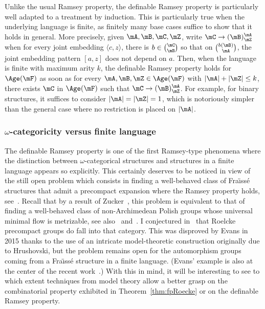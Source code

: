 Unlike the usual Ramsey property, the definable Ramsey property is particularly well adapted to a treatment by induction. This is particularly true when the underlying language is finite, as finitely many base cases suffice to show that it holds in general. More precisely, given $\mA, \mB, \mC, \mZ$, write $\mC \rightarrow (\mB)^{\mA}_{\mZ}$ when for every joint embedding $\langle c,z\rangle$, there is $b\in \binom{\mC}{\mB}$ so that on $\binom{b(\mB)}{\mA}$, the joint embedding pattern $[a,z]$ does not depend on $a$. Then, when the language is finite with maximum arity $k$, the definable Ramsey property holds for $\Age(\mF)$ as soon as for every $\mA, \mB, \mZ \in \Age(\mF)$ with $|\mA|+|\mZ|\leq k$, there exists $\mC$ in $\Age(\mF)$ such that $\mC \rightarrow (\mB)^{\mA}_{\mZ}$. For example, for binary structures, it suffices to consider $|\mA|=|\mZ|=1$, which is notoriously simpler than the general case where no restriction is placed on $|\mA|$.

\subsubsection{\texorpdfstring{$\omega$}{omega}-categoricity versus finite language}

The definable Ramsey property is one of the first Ramsey-type phenomena where the distinction between $\omega$-categorical structures and structures in a finite language appears so explicitly. This certainly deserves to be noticed in view of the still open problem which consists in finding a well-behaved class of Fra\"{\i}ss\'e structures that admit a precompact expansion where the Ramsey property holds, see~\cite{BPT}. Recall that by a result of Zucker~\cite{Z2}, this problem is equivalent to that of finding a well-behaved class of non-Archimedean Polish groups whose universal minimal flow is metrizable, see also~\cite{MNT} and~\cite{BYMT}. I conjectured in~\cite{NVT6} that Roelcke precompact groups do fall into that category. This was disproved by Evans in 2015 thanks to the use of an intricate model-theoretic construction originally due to Hrushovski, but the problem remains open for the automorphism groups coming from a Fra\"{\i}ss\'e structure in a finite language. (Evans' example is also at the center of the recent work~\cite{EHN}.) With this in mind, it will be interesting to see to which extent techniques from model theory allow a better grasp on the combinatorial property exhibited in Theorem~\ref{thm:fpRoecke} or on the definable Ramsey property.


